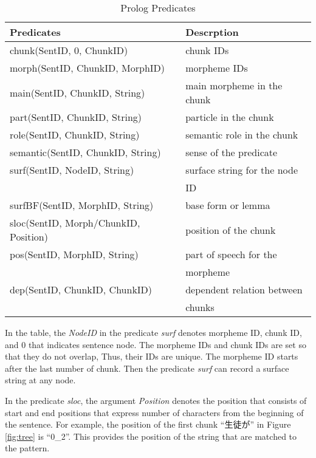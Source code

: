 \documentclass[conference]{IEEEtran}
\begin{document}
\begin{table}[htbp]
  \caption{Prolog Predicates}
  \begin{center}
    \begin{tabular}{|l|l|}\hline
      Predicates                            & Descrption                  \\\hline
      chunk(SentID, 0, ChunkID)             & chunk IDs                   \\
      morph(SentID, ChunkID, MorphID)       & morpheme IDs                \\
      main(SentID, ChunkID, String)         & main morpheme in the chunk  \\
      part(SentID, ChunkID, String)         & particle in the chunk       \\
      role(SentID, ChunkID, String)         & semantic role in the chunk  \\
      semantic(SentID, ChunkID, String)     & sense of the predicate      \\
      surf(SentID, NodeID, String)          & surface string for the node \\
                                            & ID                          \\
      surfBF(SentID, MorphID, String)       & base form or lemma          \\
      sloc(SentID, Morph/ChunkID, Position) & position of the chunk       \\
      pos(SentID, MorphID, String)          & part of speech for the      \\
                                            & morpheme                    \\
      dep(SentID, ChunkID, ChunkID)         & dependent relation between  \\
                                            & chunks                      \\\hline
    \end{tabular}
    \label{tbl:predicates}
  \end{center}
\end{table}
In the table, the {\it NodeID} in the predicate {\it surf} denotes
morpheme ID, chunk ID, and 0 that indicates sentence node.
The morpheme IDs and chunk IDs are set so that they do not overlap,
Thus, their IDs are unique. The morpheme ID starts after the last number
of chunk. Then the predicate {\it surf} can
record a surface string at any node.

In the predicate {\it sloc}, the argument {\it Position} denotes
the position that consists of start and end positions that express number of characters
from the beginning of the sentence.
For example, the position of the first chunk ``生徒が'' in Figure \ref{fig:tree}
is ``0\_2''. This provides the position of the string that are matched to the pattern.
\end{document}
